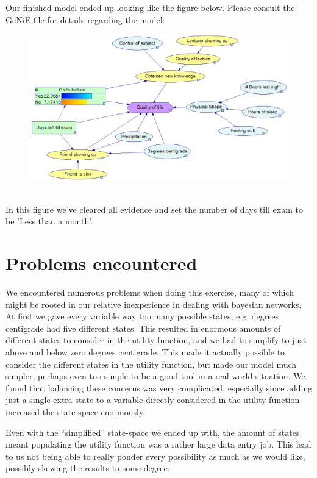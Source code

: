\documentclass{article}
\begin{document}
Our finished model ended up looking like the figure below. Please consult the
GeNiE file for details regarding the model:
\\
\begin{figure}[h]
  \centering
  \includegraphics[scale=0.29]{model.png}
\end{figure}
\\
In this figure we've cleared all evidence and set the number of days till exam
to be 'Less than a month'.

\section*{Problems encountered}

We encountered numerous problems when doing this exercise, many of which might
be rooted in our relative inexperience in dealing with bayesian networks. At
first we gave every variable way too many possible states, e.g. degrees
centigrade had five different states.  This resulted in enormous amounts of
different states to consider in the utility-function, and we had to simplify to
just above and below zero degrees centigrade. This made it actually possible to
consider the different states in the utility function, but made our model much
simpler, perhaps even too simple to be a good tool in a real world situation.
We found that balancing these concerns was very complicated, especially since
adding just a single extra state to a variable directly considered in the
utility function increased the state-space enormously.

Even with the “simplified” state-space we ended up with, the amount of states
meant populating the utility function was a rather large data entry job. This
lead to us not being able to really ponder every possibility as much as we
would like, possibly skewing the results to some degree.
\end{document}
